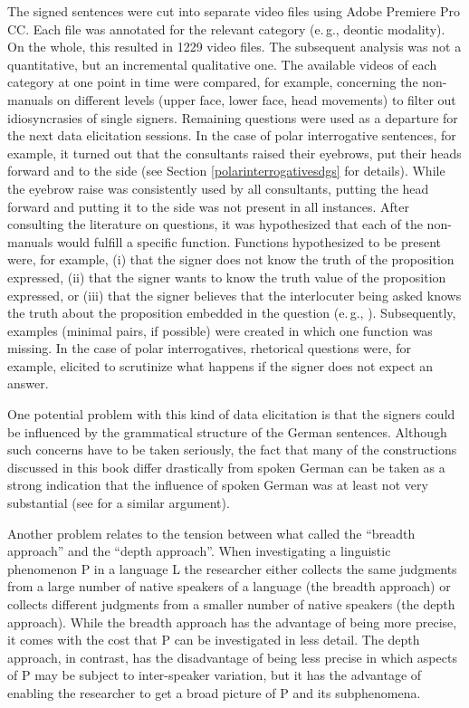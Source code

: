 The signed sentences were cut into separate video files using Adobe Premiere Pro CC. Each file was annotated for the relevant category (e.\,g., deontic modality). On the whole, this resulted in 1229 video files. The subsequent analysis was not a quantitative, but an incremental qualitative one. The available videos of each category at one point in time were compared, for example, concerning the non-manuals on different levels (upper face, lower face, head movements) to filter out idiosyncrasies of single signers. Remaining questions were used as a departure for the next data elicitation sessions. In the case of polar interrogative sentences, for example, it turned out that the consultants raised their eyebrows, put their heads forward and to the side (see Section \ref{polarinterrogativesdgs} for details). While the eyebrow raise was consistently used by all consultants, putting the head forward and putting it to the side was not present in all instances. After consulting the literature on questions, it was hypothesized that each of the non-manuals would fulfill a specific function. Functions hypothesized to be present were, for example, (i) that the signer does not know the truth of the proposition expressed, (ii) that the signer wants to know the truth value of the proposition expressed, or (iii) that the signer believes that the interlocuter being asked knows the truth about the proposition embedded in the question (e.\,g., \citealt[4]{dayal2016questions}). Subsequently, examples (minimal pairs, if possible) were created in which one function was missing. In the case of polar interrogatives, rhetorical questions were, for example, elicited to scrutinize what happens if the signer does not expect an answer.

One potential problem with this kind of data elicitation is that the signers could be influenced by the grammatical structure of the German sentences. Although such concerns have to be taken seriously, the fact that many of the constructions discussed in this book differ drastically from spoken German can be taken as a strong indication that the influence of spoken German was at least not very substantial (see \citealt[281]{cecchetto2009another} for a similar argument).

Another problem relates to the tension between what \citet[26]{zyman2012two} called the ``breadth approach'' and the ``depth approach''. When investigating a linguistic phenomenon P in a language L the researcher either collects the same judgments from a large number of native speakers of a language (the breadth approach) or collects different judgments from a smaller number of native speakers (the depth approach). While the breadth approach has the advantage of being more precise, it comes with the cost that P can be investigated in less detail. The depth approach, in contrast, has the disadvantage of being less precise in which aspects of P may be subject to inter-speaker variation, but it has the advantage of enabling the researcher to get a broad picture of P and its subphenomena.

